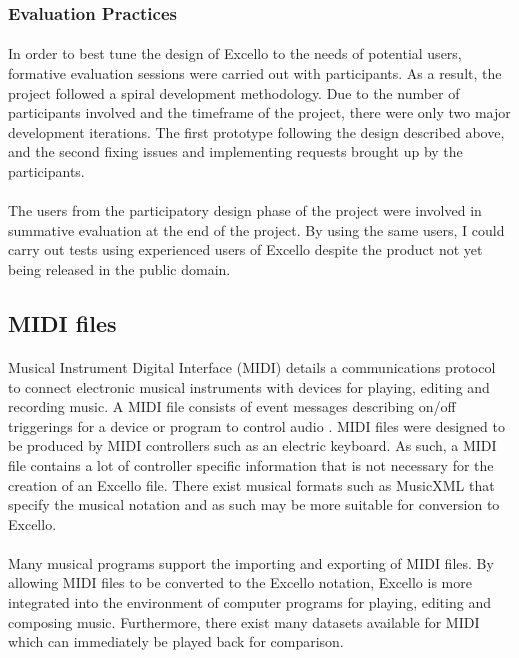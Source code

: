 \subsubsection{Evaluation Practices}

\paragraph{} In order to best tune the design of Excello to the needs of potential users, formative evaluation sessions were carried out with participants. As a result, the project followed a spiral development methodology. Due to the number of participants involved and the timeframe of the project, there were only two major development iterations. The first prototype following the design described above, and the second fixing issues and implementing requests brought up by the participants.

\paragraph{} The users from the participatory design phase of the project were involved in summative evaluation at the end of the project. By using the same users, I could carry out tests using experienced users of Excello despite the product not yet being released in the public domain.

\subsection{MIDI files}

\paragraph{} Musical Instrument Digital Interface (MIDI) details a communications protocol to connect electronic musical instruments with devices for playing, editing and recording music. A MIDI file consists of event messages describing on/off triggerings for a device or program to control audio \cite{huber:midimanual}. MIDI files were designed to be produced by MIDI controllers such as an electric keyboard. As such, a MIDI file contains a lot of controller specific information that is not necessary for the creation of an Excello file. There exist musical formats such as MusicXML that specify the musical notation and as such may be more suitable for conversion to Excello.

\paragraph{} Many musical programs support the importing and exporting of MIDI files. By allowing MIDI files to be converted to the Excello notation, Excello is more integrated into the environment of computer programs for playing, editing and composing music. Furthermore, there exist many datasets available for MIDI \cite{huang:deep} which can immediately be played back for comparison.
